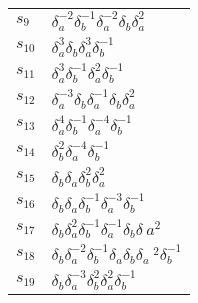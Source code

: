 \documentclass{article}
\begin{document}
\begin{center}
\begin{tabular}{ll}
$s_{9}$ & $\delta_a^{-2}\delta_b^{-1}\delta_a^{-2}\delta_b^{}\delta_a^{2}$ \\
$s_{10}$ & $\delta_a^{3}\delta_b^{}\delta_a^{3}\delta_b^{-1}$ \\
$s_{11}$ & $\delta_a^{3}\delta_b^{-1}\delta_a^{2}\delta_b^{-1}$ \\
$s_{12}$ & $\delta_a^{-3}\delta_b^{}\delta_a^{-1}\delta_b^{}\delta_a^{2}$ \\
$s_{13}$ & $\delta_a^{4}\delta_b^{-1}\delta_a^{-4}\delta_b^{-1}$ \\
$s_{14}$ & $\delta_b^{2}\delta_a^{-4}\delta_b^{-1}$ \\
$s_{15}$ & $\delta_b^{}\delta_a^{}\delta_b^{2}\delta_a^{2}$ \\
$s_{16}$ & $\delta_b^{}\delta_a^{}\delta_b^{-1}\delta_a^{-3}\delta_b^{-1}$ \\
$s_{17}$ & $\delta_b^{}\delta_a^{2}\delta_b^{-1}\delta_a^{-1}\delta_b^{}\delta_\
a^{2}$ \\
$s_{18}$ & $\delta_b^{}\delta_a^{-2}\delta_b^{-1}\delta_a^{}\delta_b^{}\delta_a\
^{2}\delta_b^{-1}$ \\
$s_{19}$ & $\delta_b^{}\delta_a^{-3}\delta_b^{2}\delta_a^{2}\delta_b^{-1}$ \\
\bottomrule
\end{tabular}
\end{center}

\thispagestyle{empty}
\end{document}
